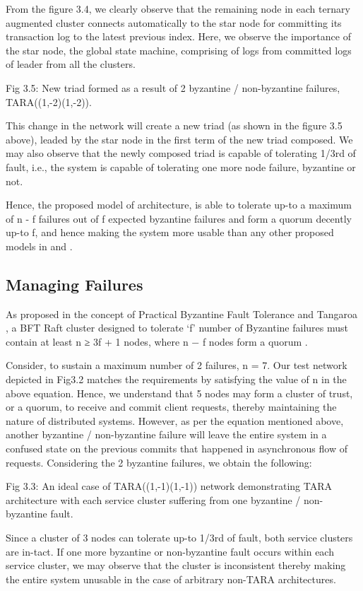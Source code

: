 \documentclass[]{article}
\begin{document}
From the figure 3.4, we clearly observe that the remaining node in each ternary augmented cluster connects automatically to the star node for committing its transaction log to the latest previous index. Here, we observe the importance of the star node, the global state machine, comprising of logs from committed logs of leader from all the clusters.


Fig 3.5: New triad formed as a result of 2 byzantine / non-byzantine failures, TARA((1,-2)(1,-2)).

This change in the network will create a new triad (as shown in the figure 3.5 above), leaded by the star node in the first term of the new triad composed. We may also observe that the newly composed triad is capable of tolerating 1/3rd of fault, i.e., the system is capable of tolerating one more node failure, byzantine or not.

Hence, the proposed model of architecture, is able to tolerate up-to a maximum of n - f failures out of f expected byzantine failures and form a quorum decently up-to f, and hence making the system more usable than any other proposed models in \cite{ARTICLE:1} and \cite{ARTICLE:3}.

\subsection{Managing Failures}
As proposed in the concept of Practical Byzantine Fault Tolerance\cite{ARTICLE:1} and Tangaroa\cite{ARTICLE:3} , a BFT Raft cluster designed to tolerate ‘f’ number of Byzantine failures must contain at least n ≥ 3f + 1 nodes, where n − f nodes form a quorum \cite{ARTICLE:3}.

Consider, to sustain a maximum number of 2 failures, n = 7. Our test network depicted in Fig3.2 matches the requirements by satisfying the value of n in the above equation. Hence, we understand that 5 nodes may form a cluster of trust, or a quorum, to receive and commit client requests, thereby maintaining the nature of distributed systems. However, as per the equation mentioned above, another byzantine / non-byzantine failure will leave the entire system in a confused state on the previous commits that happened in asynchronous flow of requests.
Considering the 2 byzantine failures, we obtain the following:

Fig 3.3: An ideal case of TARA((1,-1)(1,-1)) network demonstrating TARA architecture with each service cluster suffering from one byzantine / non-byzantine fault.

Since a cluster of 3 nodes can tolerate up-to 1/3rd of fault, both service clusters are in-tact. If one more byzantine or non-byzantine fault occurs within each service cluster, we may observe that the cluster is inconsistent thereby making the entire system unusable in the case of arbitrary non-TARA architectures.
\end{document}
